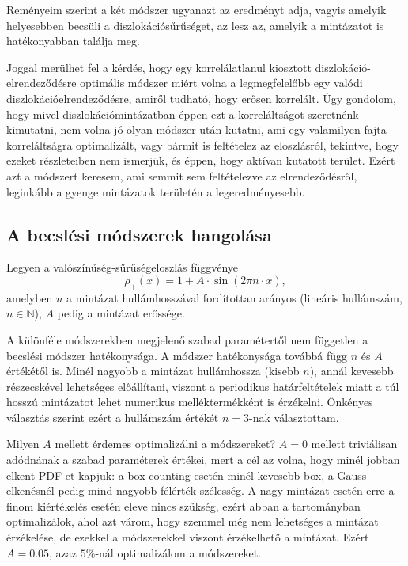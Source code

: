 \documentclass[10pt,a4paper]{scrartcl}
\begin{document}
Reményeim szerint a két módszer ugyanazt az eredményt adja, vagyis amelyik helyesebben becsüli a diszlokációsűrűséget, az lesz az, amelyik a mintázatot is hatékonyabban találja meg.

Joggal merülhet fel a kérdés, hogy egy korrelálatlanul kiosztott diszlokáció-elrendeződésre optimális módszer miért volna a legmegfelelőbb egy valódi diszlokációelrendeződésre, amiről tudható, hogy erősen korrelált. Úgy gondolom, hogy mivel diszlokációmintázatban éppen ezt a korreláltságot szeretnénk kimutatni, nem volna jó olyan módszer után kutatni, ami egy valamilyen fajta korreláltságra optimalizált, vagy bármit is feltételez az eloszlásról, tekintve, hogy ezeket részleteiben nem ismerjük, és éppen, hogy aktívan kutatott terület. Ezért azt a módszert keresem, ami semmit sem feltételezve az elrendeződésről, leginkább a gyenge mintázatok területén a legeredményesebb.

\subsection{A becslési módszerek hangolása}
Legyen a valószínűség-sűrűségeloszlás függvénye
\[{\rho _ + }\left( x \right) = 1 + A \cdot \sin \left( {2\pi n \cdot x} \right),\]
amelyben $n$ a mintázat hullámhosszával fordítottan arányos (lineáris hullámszám, $n \in \mathbb{N}$), $A$ pedig a mintázat erőssége.

A különféle módszerekben megjelenő szabad paramétertől nem független a becslési módszer hatékonysága. A módszer hatékonysága továbbá függ $n$ és $A$ értékétől is. Minél nagyobb a mintázat hullámhossza (kisebb $n$), annál kevesebb részecskével lehetséges előállítani, viszont a periodikus határfeltételek miatt a túl hosszú mintázatot lehet numerikus melléktermékként is érzékelni. Önkényes választás szerint ezért a hullámszám értékét $n=3$-nak választottam.

Milyen $A$ mellett érdemes optimalizálni a módszereket? $A=0$ mellett triviálisan adódnának a szabad paraméterek értékei, mert a cél az volna, hogy minél jobban elkent PDF-et kapjuk: a box counting esetén minél kevesebb box, a Gauss-elkenésnél pedig mind nagyobb félérték-szélesség. A nagy mintázat esetén erre a finom kiértékelés esetén eleve nincs szükség, ezért abban a tartományban optimalizálok, ahol azt várom, hogy szemmel még nem lehetséges a mintázat érzékelése, de ezekkel a módszerekkel viszont érzékelhető a mintázat. Ezért $A=0.05$, azaz $5\%$-nál optimalizálom a módszereket.
\end{document}
